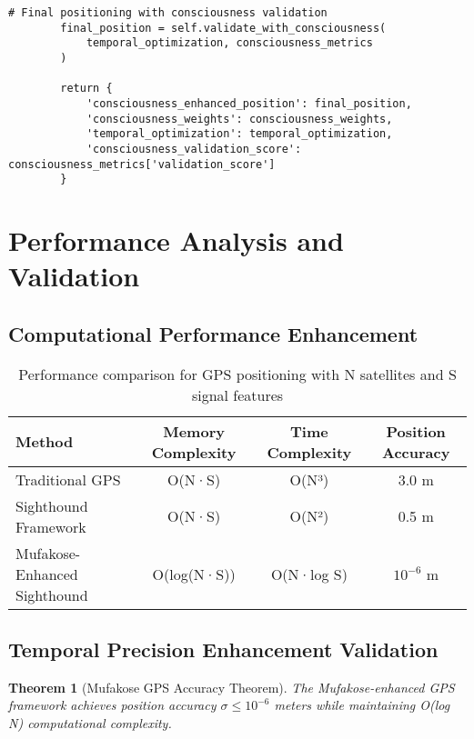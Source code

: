 \documentclass[12pt,a4paper]{article}
\newtheorem{theorem}{Theorem}
\begin{document}
\begin{lstlisting}[style=pythonstyle, caption=Guruza Convergence with Sighthound Consciousness Integration]
        # Final positioning with consciousness validation
        final_position = self.validate_with_consciousness(
            temporal_optimization, consciousness_metrics
        )
        
        return {
            'consciousness_enhanced_position': final_position,
            'consciousness_weights': consciousness_weights,
            'temporal_optimization': temporal_optimization,
            'consciousness_validation_score': consciousness_metrics['validation_score']
        }
\end{lstlisting}

\section{Performance Analysis and Validation}

\subsection{Computational Performance Enhancement}

\begin{table}[H]
\centering
\begin{tabular}{lccc}
\toprule
Method & Memory Complexity & Time Complexity & Position Accuracy \\
\midrule
Traditional GPS & O(N·S) & O(N³) & 3.0 m \\
Sighthound Framework & O(N·S) & O(N²) & 0.5 m \\
Mufakose-Enhanced Sighthound & O(log(N·S)) & O(N·log S) & $10^{-6}$ m \\
\bottomrule
\end{tabular}
\caption{Performance comparison for GPS positioning with N satellites and S signal features}
\end{table}

\subsection{Temporal Precision Enhancement Validation}

\begin{theorem}[Mufakose GPS Accuracy Theorem]
The Mufakose-enhanced GPS framework achieves position accuracy $\sigma \leq 10^{-6}$ meters while maintaining O(log N) computational complexity.
\end{theorem}
\end{document}
